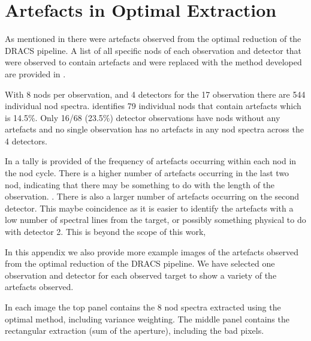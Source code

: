 
\chapter{Artefacts in Optimal Extraction} %
\label{appendix:artefacts}





As mentioned in  there were artefacts observed from the optimal reduction of the {DRACS} pipeline. A list of all specific nods of each observation and detector that were observed to contain artefacts and were replaced with the method developed are provided in .

With 8 nods per observation, and 4 detectors for the 17 observation there are 544 individual nod spectra.  identifies 79 individual nods that contain artefacts which is 14.5\%. Only 16/68 (23.5\%) detector observations have nods without any artefacts and no single observation has no artefacts in any nod spectra across the 4 detectors.

In  a tally is provided of the frequency of artefacts occurring within each nod in the nod cycle. There is a higher number of artefacts occurring in the last two nod, indicating that there may be something to do with the length of the observation. .
There is also a larger number of artefacts occurring on the second detector. This maybe coincidence as it is easier to identify the artefacts with a low number of spectral lines from the target, or possibly something physical to do with detector 2. This is beyond the scope of this work, 

In this appendix we also provide more example images of the artefacts observed from the optimal reduction of the {DRACS} pipeline. We have selected one observation and detector for each observed target to show a variety of the artefacts observed.

In each image the top panel contains the 8 nod spectra extracted using the optimal method, including variance weighting. The middle panel contains the rectangular extraction (sum of the aperture), including the bad pixels.

